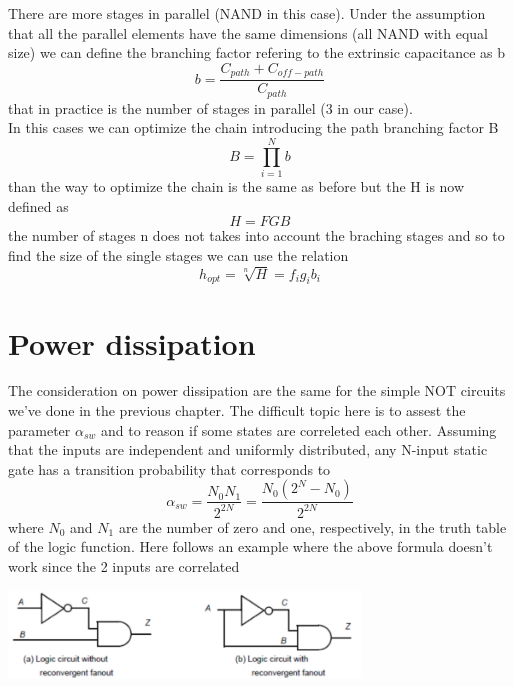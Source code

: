 There are more stages in parallel (NAND in this case). Under the assumption that all the parallel elements have the same dimensions (all NAND with equal size) we can define the branching factor refering to the extrinsic capacitance as b
\begin{equation}
b=\frac{C_{path}+C_{off-path}}{C_{path}}
\end{equation}
that in practice is the number of stages in parallel (3 in our case).\\
\vspace{5mm}
In this cases we can optimize the chain introducing the path branching factor B
\begin{equation}
B=\prod_{i=1}^N b
\end{equation}
than the way to optimize the chain is the same as before but the H is now defined as 
\begin{equation}
H=FGB
\end{equation}
the number of stages n does not takes into account the braching stages and so to find the size of the single stages we can use the relation
\begin{equation}
h_{opt}=\sqrt[n]{H}=f_ig_ib_i
\end{equation}


\section{Power dissipation}
The consideration on power dissipation are the same for the simple NOT circuits we've done in the previous chapter. The difficult topic here is to assest the parameter $\alpha_{sw}$ and to reason if some states are correleted each other.
\vspace{5mm}
Assuming that the inputs are independent and uniformly distributed, any N-input static gate has a transition probability that corresponds to
\begin{equation}
\alpha_{sw}=\frac{N_0N_1}{2^{2N}}=\frac{N_0(2^N-N_0)}{2^{2N}}
\end{equation}
where $N_0$ and $N_1$ are the number of zero and one, respectively, in the truth table of the logic function.
\vspace{5mm}
Here follows an example where the above formula doesn't work since the 2 inputs are correlated


\centering
\includegraphics[width=0.7\textwidth]{C6_7.png}\\
\raggedright




















